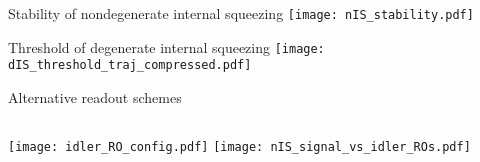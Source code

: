 \documentclass[12pt,xcolor=dvipsnames]{beamer}
\begin{document}
\begin{frame}[noframenumbering]{Stability of nondegenerate internal squeezing}
\centering
\texttt{[image: nIS\_stability.pdf]}
\end{frame}

\begin{frame}[noframenumbering]{Threshold of degenerate internal squeezing}
\centering
\texttt{[image: dIS\_threshold\_traj\_compressed.pdf]}
\end{frame}

\begin{frame}[noframenumbering]{Alternative readout schemes}
\begin{columns}
\texttt{[image: idler\_RO\_config.pdf]}
\centering
{}
\centering
\texttt{[image: nIS\_signal\_vs\_idler\_ROs.pdf]}
\end{columns}
\end{frame}
\end{document}

